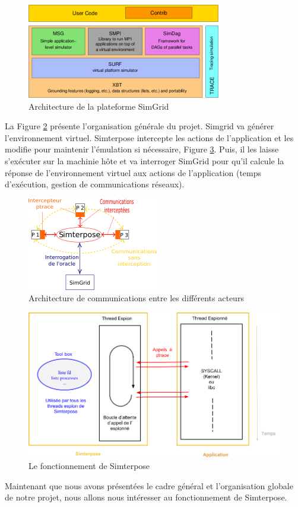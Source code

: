 \begin{figure}[H]
  \centering
  \includegraphics[scale=0.86]{Pictures/png/SimGrid}
  \caption{Architecture de la plateforme SimGrid}
  \label{SimGrid}
\end{figure}

La Figure \ref{Organisation_generale} présente l'organisation générale du
projet. Simgrid va générer l'environnement virtuel. Simterpose intercepte les
actions de l'application et les modifie pour maintenir l'émulation si
nécessaire, Figure \ref{Organisation_Simterpose}. Puis, il les laisse
s'exécuter sur la machinie hôte et va interroger SimGrid pour qu'il calcule la
réponse de l'environnement virtuel aux actions de l'application (temps d'exécution, gestion de communications réseaux).

\begin{figure}[H]
  \centering
  \includegraphics{Pictures/png/Communications_Simterpose_interprocess_v2}
  \caption{Architecture de communications entre les différents acteurs}
  \label{Organisation_generale}
\end{figure}

\begin{figure}[H]
  \centering
  \includegraphics[scale=0.5]{Pictures/png/Simterpose_orga_code_v3}
  \caption{Le fonctionnement de Simterpose}
  \label{Organisation_Simterpose}
\end{figure}

Maintenant que nous avons présentées le cadre général et l'organisation globale
de notre projet, nous allons nous intéresser au fonctionnement de Simterpose.
